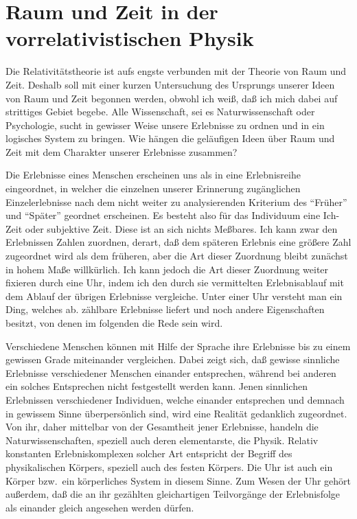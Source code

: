 %
%

\section{Raum und Zeit in der vorrelativistischen Physik}
\label{sec:rau-1}

Die Relativitätstheorie ist aufs engste verbunden mit der Theorie von Raum und 
Zeit. Deshalb soll mit einer kurzen Untersuchung des Ursprungs unserer Ideen von 
Raum und Zeit begonnen werden, obwohl ich weiß, daß ich mich dabei auf 
strittiges Gebiet begebe. Alle Wissenschaft, sei es Naturwissenschaft oder 
Psychologie, sucht in gewisser Weise unsere Erlebnisse zu ordnen und in ein 
logisches System zu bringen. Wie hängen die geläufigen Ideen über Raum und Zeit 
mit dem Charakter unserer Erlebnisse zusammen?

Die Erlebnisse eines Menschen erscheinen uns als in eine Erlebnisreihe 
eingeordnet, in welcher die einzelnen unserer Erinnerung zugänglichen 
Einzelerlebnisse nach dem nicht weiter zu analysierenden Kriterium des 
\enquote{Früher} und \enquote{Später} geordnet erscheinen. Es besteht also für 
das Individuum eine Ich-Zeit oder subjektive Zeit. Diese 
ist an sich nichts Meßbares. Ich kann zwar den Erlebnissen Zahlen zuordnen, 
derart, daß dem späteren Erlebnis eine größere Zahl zugeordnet wird als dem 
früheren, aber die Art dieser Zuordnung bleibt zunächst in hohem Maße 
willkürlich. Ich kann jedoch die Art dieser Zuordnung weiter fixieren durch eine 
Uhr, indem ich den durch sie vermittelten Erlebnisablauf mit dem Ablauf der 
übrigen Erlebnisse vergleiche. Unter einer Uhr versteht man ein Ding, welches 
ab. zählbare Erlebnisse liefert und noch andere Eigenschaften besitzt, von denen 
im folgenden die Rede sein wird.

Verschiedene Menschen können mit Hilfe der Sprache ihre Erlebnisse bis zu einem 
gewissen Grade miteinander vergleichen. Dabei zeigt sich, daß gewisse sinnliche 
Erlebnisse verschiedener Menschen einander entsprechen, während bei anderen ein 
solches Entsprechen nicht festgestellt werden kann. Jenen sinnlichen Erlebnissen 
verschiedener Individuen, welche einander entsprechen und demnach in gewissem 
Sinne überpersönlich sind, wird eine Realität gedanklich zugeordnet. Von ihr, 
daher mittelbar von der Gesamtheit jener Erlebnisse, handeln die 
Naturwissenschaften, speziell auch deren elementarste, die Physik. Relativ 
konstanten Erlebniskomplexen solcher Art entspricht der Begriff des 
physikalischen Körpers, speziell auch des festen Körpers. Die Uhr ist auch ein 
Körper bzw.\ ein körperliches System in diesem Sinne. Zum Wesen der Uhr gehört 
außerdem, daß die an ihr gezählten gleichartigen Teilvorgänge der Erlebnisfolge 
als einander gleich angesehen werden dürfen.

